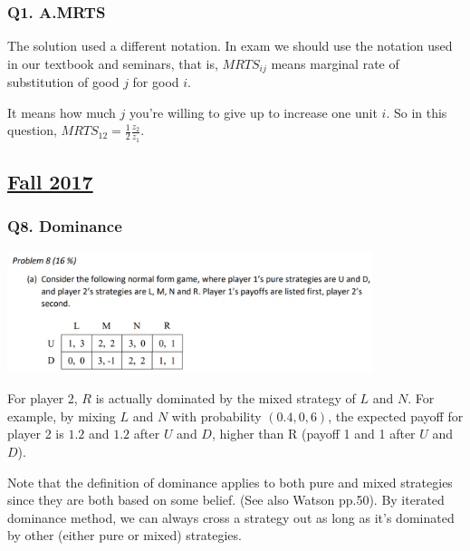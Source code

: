 \documentclass{article}
\begin{document}
\subsubsection{Q1. A.MRTS}

The solution used a different notation. In exam we should use the notation used in our textbook and seminars, that is, $MRTS_{ij}$ means marginal rate of substitution of good $j$ for good $i$.

\medskip

It means how much $j$ you're willing to give up to increase one unit $i$. So in this question, $MRTS_{12}= \frac{1}{2} \frac{z_2}{z_1}$.


\subsection{\href{https://www.uio.no/studier/emner/sv/oekonomi/ECON3200/previous-exams/econ32_4200-2017h-sensorveiledning.pdf}{Fall 2017}}

\subsubsection{Q8. Dominance}

\begin{center}
\includegraphics[width=0.8\textwidth]{e3200_2017_q8}
\end{center}
\vspace{2mm}

For player 2, $R$ is actually dominated by the mixed strategy of $L$ and $N$. For example, by mixing $L$ and $N$ with probability $(0.4,0,6)$, the expected payoff for player 2 is $1.2$ and $1.2$ after $U$ and $D$, higher than R (payoff 1 and 1 after $U$ and $D$).

\smallskip

Note that the definition of dominance applies to both pure and mixed strategies since they are both based on some belief. 
(See also Watson pp.50).  By iterated dominance method, we can always cross a strategy out as long as it's dominated by other (either pure or mixed) strategies. 
\end{document}
